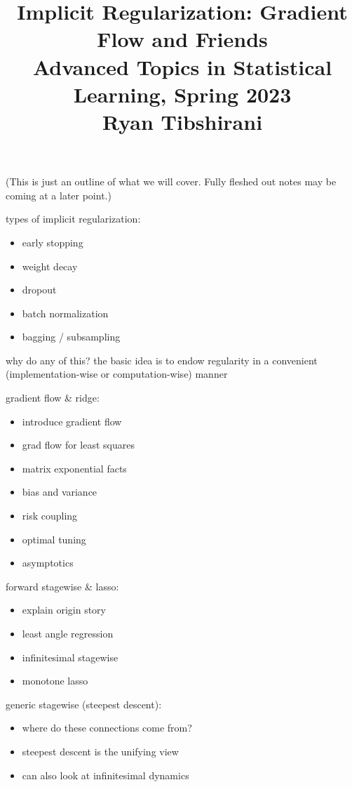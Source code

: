 \documentclass{article}
\title{Implicit Regularization: Gradient Flow and Friends \\ \smallskip
\large Advanced Topics in Statistical Learning, Spring 2023 \\ \smallskip
Ryan Tibshirani}
\date{}
\begin{document}
\maketitle
\RaggedRight
\vspace{-50pt}

(This is just an outline of what we will cover. Fully fleshed out notes may be
coming at a later point.)  

\bigskip
types of implicit regularization:

\begin{itemize}
\item early stopping 
\item weight decay 
\item dropout 
\item batch normalization 
\item bagging / subsampling
\end{itemize}

why do any of this? the basic idea is to endow regularity in a convenient
(implementation-wise or computation-wise) manner  

\bigskip
gradient flow \& ridge:

\begin{itemize}
\item introduce gradient flow 
\item grad flow for least squares 
\item matrix exponential facts
\item bias and variance 
\item risk coupling 
\item optimal tuning 
\item asymptotics
\end{itemize}

\bigskip 
forward stagewise \& lasso:

\begin{itemize}
\item explain origin story
\item least angle regression
\item infinitesimal stagewise 
\item monotone lasso
\end{itemize}

\bigskip 
generic stagewise (steepest descent):

\begin{itemize}
\item where do these connections come from?
\item steepest descent is the unifying view
\item can also look at infinitesimal dynamics
\end{itemize}
\end{document}
